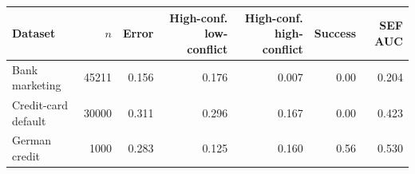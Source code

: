\begin{tabular}{lrrrrrr}
\toprule
Dataset & $n$ & Error & High-conf. low-conflict & High-conf. high-conflict & Success & SEF AUC \\
\midrule
Bank marketing & 45211 & 0.156 & 0.176 & 0.007 & 0.00 & 0.204 \\
Credit-card default & 30000 & 0.311 & 0.296 & 0.167 & 0.00 & 0.423 \\
German credit & 1000 & 0.283 & 0.125 & 0.160 & 0.56 & 0.530 \\
\bottomrule
\end{tabular}

